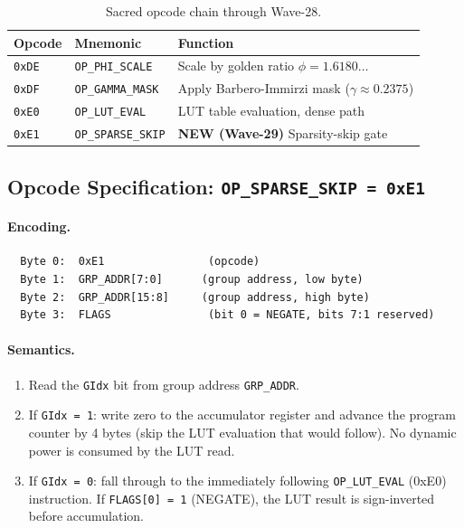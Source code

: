 \begin{table}[htbp]
  \centering
  \caption{Sacred opcode chain through Wave-28.}
  \label{tab:opcode-chain-pre-wave29}
  \begin{tabular}{llp{7cm}}
    \toprule
    \textbf{Opcode} & \textbf{Mnemonic}        & \textbf{Function} \\
    \midrule
    \texttt{0xDE}   & \texttt{OP\_PHI\_SCALE}   & Scale by golden ratio $\phi = 1.6180\ldots$ \\
    \texttt{0xDF}   & \texttt{OP\_GAMMA\_MASK}  & Apply Barbero-Immirzi mask ($\gamma \approx 0.2375$) \\
    \texttt{0xE0}   & \texttt{OP\_LUT\_EVAL}    & LUT table evaluation, dense path \\
    \texttt{0xE1}   & \texttt{OP\_SPARSE\_SKIP} & \textbf{NEW (Wave-29)} Sparsity-skip gate \\
    \bottomrule
  \end{tabular}
\end{table}

\subsection{Opcode Specification: \texttt{OP\_SPARSE\_SKIP = 0xE1}}
\label{subsec:ch79-opcode-spec}

\paragraph{Encoding.}
\begin{verbatim}
  Byte 0:  0xE1                (opcode)
  Byte 1:  GRP_ADDR[7:0]      (group address, low byte)
  Byte 2:  GRP_ADDR[15:8]     (group address, high byte)
  Byte 3:  FLAGS               (bit 0 = NEGATE, bits 7:1 reserved)
\end{verbatim}

\paragraph{Semantics.}
\begin{enumerate}
  \item Read the \texttt{GIdx} bit from group address \texttt{GRP\_ADDR}.
  \item If \texttt{GIdx = 1}: write zero to the accumulator register
        and advance the program counter by 4 bytes (skip the LUT
        evaluation that would follow).
        No dynamic power is consumed by the LUT read.
  \item If \texttt{GIdx = 0}: fall through to the immediately following
        \texttt{OP\_LUT\_EVAL} (0xE0) instruction.
        If \texttt{FLAGS[0] = 1} (NEGATE), the LUT result is
        sign-inverted before accumulation.
\end{enumerate}

